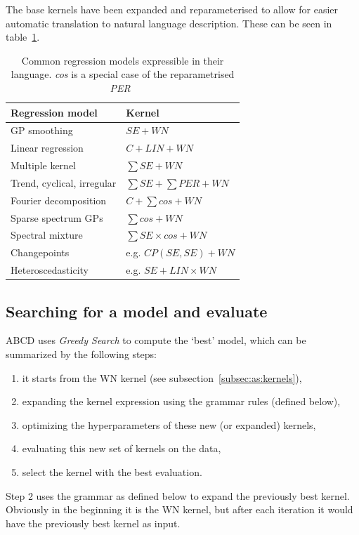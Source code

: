 \documentclass[a4paper, 10pt, conference]{ieeeconf}
\begin{document}
The base kernels have been expanded and reparameterised to allow for easier automatic translation to natural language description. These can be seen in table~\ref{tab:regressionmodelkernel}.

\begin{table}[!ht]
\begin{tabular}{ll}
Regression model                                & Kernel                    \\ \hline
\multicolumn{1}{l|}{GP smoothing}               & $SE + WN$                 \\
\multicolumn{1}{l|}{Linear regression}          & $C + LIN + WN$            \\
\multicolumn{1}{l|}{Multiple kernel}            & $\sum SE + WN$            \\
\multicolumn{1}{l|}{Trend, cyclical, irregular} & $\sum SE + \sum PER + WN$ \\
\multicolumn{1}{l|}{Fourier decomposition}      & $C + \sum cos + WN$       \\
\multicolumn{1}{l|}{Sparse spectrum GPs}        & $\sum cos + WN$           \\
\multicolumn{1}{l|}{Spectral mixture}           & $\sum SE \times cos + WN$ \\
\multicolumn{1}{l|}{Changepoints}               & e.g. $CP(SE, SE) + WN$    \\
\multicolumn{1}{l|}{Heteroscedasticity}         & e.g. $SE + LIN \times WN$
\end{tabular}
\caption{Common regression models expressible in their language. \textit{cos} is a special case of the reparametrised \textit{PER}~\cite{lloyd2014automatic}}
\label{tab:regressionmodelkernel}
\end{table}

\subsection{Searching for a model and evaluate}
ABCD uses \textit{Greedy Search} to compute the `best' model, which can be summarized by the following steps:
\begin{enumerate}
    \item it starts from the WN kernel (see subsection~\ref{subsec:as:kernels}),
    \item expanding the kernel expression using the grammar rules (defined below),
    \item optimizing the hyperparameters of these new (or expanded) kernels,
    \item evaluating this new set of kernels on the data,
    \item select the kernel with the best evaluation.
\end{enumerate}
Step 2 uses the grammar as defined below to expand the previously best kernel. Obviously in the beginning it is the WN kernel, but after each iteration it would have the previously best kernel as input. 
\end{document}
